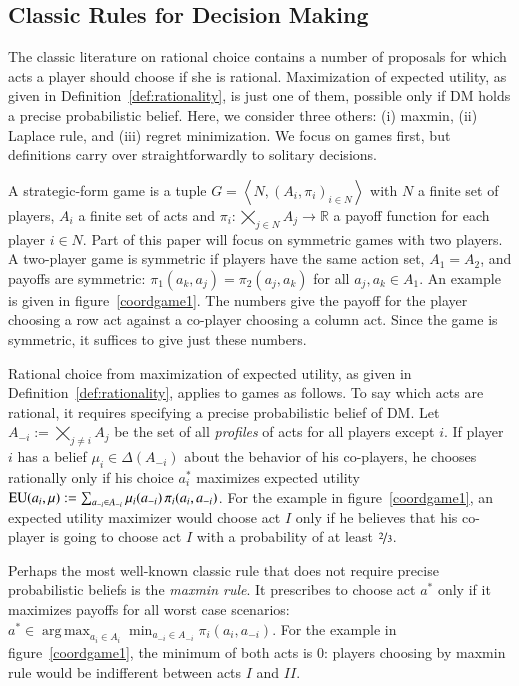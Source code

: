\documentclass[fleqn,reqno,12pt]{article}
\theoremstyle{Satz}
\theoremstyle{Bsp}
\newcommand{\tuple}[1]{\left \langle #1\right\rangle}
\DeclareMathOperator*{\argmax}{arg\,max}
\newcommand{\myts}{\ensuremath{\thinspace}}
\newcommand{\Acts}{\ensuremath{A}\xspace}		%
\newcommand{\act}{\ensuremath{a}\xspace}		%
\newcommand{\EU}{\ensuremath{\operatorname{EU}}} %
\begin{document}
\subsection{Classic Rules for Decision Making}
\label{sec:choice-rules}

The classic literature on rational choice contains a number of proposals for which acts a
player should choose if she is rational. Maximization of expected utility, as
given in Definition~\ref{def:rationality}, is just one of them, possible only if DM holds a precise probabilistic belief.
Here, we consider three others:
(i) maxmin, (ii) Laplace rule, and (iii) regret minimization. 
We focus on games first, but definitions carry over straightforwardly to solitary decisions.

A strategic-form game is a tuple $ G=\tuple{ N, (A_i , \pi_i)_{i \in N} }$ with $N$ a finite set of
players, $A_i$ a finite set of acts and $\pi_i: \bigtimes_{j \in N} A_j \rightarrow \mathbb{R}$ a payoff function for each player $i \in N$.
Part of this paper will focus on symmetric games with two players. A two-player game is
symmetric if players have the same action set, $A_1 = A_2$, and payoffs are symmetric:
$\pi_1(a_k, a_j) = \pi_2(a_j, a_k)$ for all $a_j,a_k \in A_1$. An example is given in
figure~\ref{coordgame1}. The numbers give the payoff for the player choosing a row act against
a co-player choosing a column act. Since the game is symmetric, it suffices to give just these
numbers.

Rational choice from maximization of expected utility, as given in
Definition~\ref{def:rationality}, applies to games as follows. To say which acts are rational,
it requires specifying a precise probabilistic belief of DM. Let $A_{-i} := \bigtimes_{j \neq i} A_j$ be
the set of all \emph{profiles} of acts for all players except $i$. If player $i$ has a belief
$\mu_i \in \Delta(A_{-i})$ about the behavior of his co-players, he chooses rationally only if
his choice $a^*_i$ maximizes expected utility
$\EU(a_i, \mu) := \sum_{\act_{-i} \in \Acts_{-i}} \mu_i(\act_{-i}) \myts \pi_i(a_i, a_{-i})$. For
the example in figure~\ref{coordgame1}, an expected utility maximizer would choose act $I$ only if he
believes that his co-player is going to choose act $I$ with a probability of at least
$\nicefrac{2}{3}$.

Perhaps the most well-known classic rule that does not require precise probabilistic
beliefs is the \emph{maxmin rule}. It prescribes to choose act $\act^*$ only if it
maximizes payoffs for all worst case scenarios:
$\act^* \in \argmax_{a_i \in \Acts_i} \min_{a_{-i} \in \Acts_{-i}} \pi_i(a_{i},
a_{-i})$.
For the example in figure~\ref{coordgame1}, the minimum of both acts is 0: players choosing by maxmin
rule would be indifferent between acts $I$ and $II$.
\end{document}
